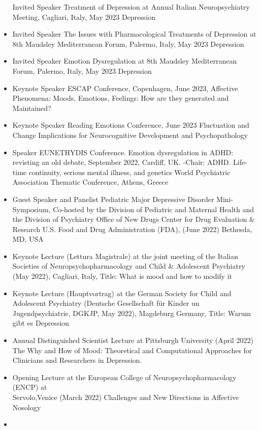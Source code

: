 \documentclass[
]{article}
\begin{document}
\begin{itemize}
  Invited Speaker Treatment of Depression at Annual Italian
  Neuropsychiatry Meeting, Cagliari, Italy, May 2023 Depression
\item
  Invited Speaker The Issues with Pharmacological Treatments of
  Depression at 8th Maudsley Mediterranean Forum, Palermo, Italy, May
  2023 Depression
\item
  Invited Speaker Emotion Dysregulation at 8th Maudsley Mediterranean
  Forum, Palermo, Italy, May 2023 Depression
\item
  Keynote Speaker ESCAP Conference, Copenhagen, June 2023, Affective
  Phenomena: Moods, Emotions, Feelings: How are they generated and
  Maintained?
\item
  Keynote Speaker Reading Emotions Conference, June 2023 Fluctuation and
  Change Implications for Neurocognitive Development and Psychopathology
\item
  Speaker EUNETHYDIS Conference. Emotion dysregulation in ADHD:
  revisting an old debate, September 2022, Cardiff, UK. -Chair: ADHD.
  Life-time continuity, serious mental illness, and genetics World
  Psychiatric Association Thematic Conference, Athens, Greece
\item
  Guest Speaker and Panelist Pediatric Major Depressive Disorder
  Mini-Symposium, Co-hosted by the Division of Pediatric and Maternal
  Health and the Division of Psychiatry Office of New Drugs \textbar{}
  Center for Drug Evaluation \& Research \textbar{} U.S. Food and Drug
  Administration (FDA), (June 2022) Bethesda, MD, USA
\item
  Keynote Lecture (Lettura Magistrale) at the joint meeting of the
  Italian Societies of Neuropsychopharmacology and Child \& Adolescent
  Psychiatry (May 2022), Cagliari, Italy, Title: What is mood and how to
  modify it
\item
  Keynote Lecture (Hauptvortrag) at the German Society for Child and
  Adolescent Psychiatry (Deutsche Gesellschaft für Kinder un
  Jugendpsychiatrie, DGKJP, May 2022), Magdeburg Germany, Title: Warum
  gibt es Depression
\item
  Annual Distinguished Scientist Lecture at Pittsburgh University (April
  2022) The Why and How of Mood: Theoretical and Computational
  Approaches for Clinicians and Researchers in Depression.
\item
  Opening Lecture at the European College of Neuropsychopharmacology
  (ENCP) at\\
  Servolo,Venice (March 2022) Challenges and New Directions in Affective
  Nosology
\item

\end{itemize}
\end{document}
